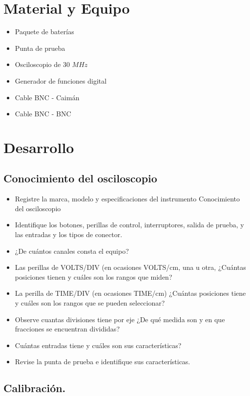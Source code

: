 \documentclass[11pt]{article}
\begin{document}
\begin{multicols}{2}
\section{Material y Equipo}

	\begin{itemize}
		\item Paquete de baterías
		\item Punta de prueba
		\item Osciloscopio de 30 $MHz$ 
		\item Generador de funciones digital 
		\item Cable BNC - Caimán
		\item Cable BNC - BNC
	\end{itemize}




\section{Desarrollo}
		\subsection{Conocimiento del osciloscopio}

			\begin{itemize}
				\item Registre la marca, modelo y especificaciones del instrumento Conocimiento del osciloscopio
				\item Identifique los botones, perillas de control, interruptores, salida de prueba, y las entradas y los tipos de conector.
				\item ¿De cuántos canales consta el equipo?
				\item Las perillas de VOLTS/DIV (en ocasiones VOLTS/cm, una u otra, ¿Cuántas posiciones tienen y cuáles son los rangos que miden?
				\item La perilla de TIME/DIV (en ocasiones TIME/cm) ¿Cuántas posiciones tiene y cuáles son los rangos que se pueden seleccionar?
				\item Observe cuantas divisiones tiene por eje ¿De qué medida son y en que fracciones se encuentran divididas?
				\item Cuántas entradas tiene y cuáles son sus características?
				\item Revise la punta de prueba e identifique sus características.
			\end{itemize}


	\subsection{Calibración.}
			

\end{multicols}
\end{document}
